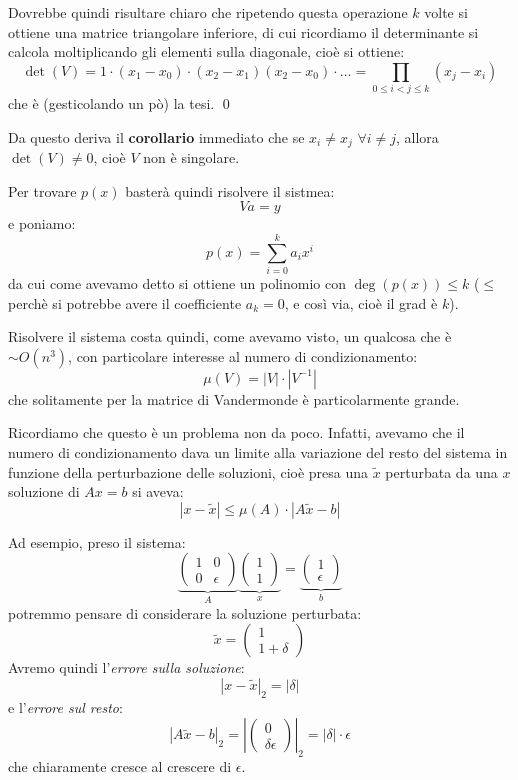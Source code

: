 \documentclass[a4paper,11pt]{article}
\begin{document}
Dovrebbe quindi risultare chiaro che ripetendo questa operazione $k$ volte si ottiene una matrice triangolare inferiore, di cui ricordiamo il determinante si calcola moltiplicando gli elementi sulla diagonale, cioè si ottiene:
$$
\det(V) = 1 \cdot (x_1 - x_0) \cdot (x_2 - x_1) (x_2 - x_0) \cdot ... = \prod_{0 \leq i < j \leq k} (x_j - x_i)
$$
che è (gesticolando un pò) la tesi. \qed

Da questo deriva il \textbf{corollario} immediato che se $x_i \neq x_j$ $\forall i \neq j$, allora $\det(V) \neq 0$, cioè $V$ non è singolare.

\par\smallskip

Per trovare $p(x)$ basterà quindi risolvere il sistmea:
$$
Va = y
$$
e poniamo:
$$
p(x) = \sum_{i = 0}^k a_i x^i
$$
da cui come avevamo detto si ottiene un polinomio con $\deg(p(x)) \leq k$ ($\leq$ perchè si potrebbe avere il coefficiente $a_k = 0$, e così via, cioè il grad è  $k$).

Risolvere il sistema costa quindi, come avevamo visto, un qualcosa che è $\sim O(n^3)$, con particolare interesse al numero di condizionamento:
$$
\mu(V) = |V| \cdot |V^{-1}|
$$
che solitamente per la matrice di Vandermonde è particolarmente grande.

\par\smallskip

Ricordiamo che questo è un problema non da poco.
Infatti, avevamo che il numero di condizionamento dava un limite alla variazione del resto del sistema in funzione della perturbazione delle soluzioni, cioè presa una $\tilde{x}$ perturbata da una $x$ soluzione di $Ax = b$ si aveva:
$$
|x - \tilde{x}| \leq \mu(A) \cdot |A \tilde{x} - b|
$$

Ad esempio, preso il sistema:
$$
\underbrace{
\begin{pmatrix}
	1 & 0 \\ 
	0 & \epsilon
\end{pmatrix}
}_A
\underbrace{
\begin{pmatrix}
	1 \\ 1
\end{pmatrix}
}_x
=
\underbrace{
\begin{pmatrix}
	1 \\ \epsilon
\end{pmatrix}
}_b
$$
potremmo pensare di considerare la soluzione perturbata:
$$
\tilde{x} =
\begin{pmatrix}
	1 \\ 1 + \delta
\end{pmatrix}
$$
Avremo quindi l'\textit{errore sulla soluzione}:
$$
|x - \tilde{x}|_2 = |\delta|
$$
e l'\textit{errore sul resto}:
$$
|A \tilde{x} - b|_2 = \left| \begin{pmatrix}
	0 \\ \delta \epsilon
\end{pmatrix} \right|_2
= |\delta| \cdot \epsilon
$$
che chiaramente cresce al crescere di $\epsilon$.
\end{document}
